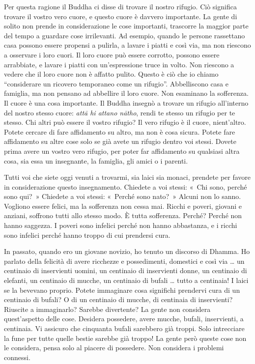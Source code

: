 Per questa ragione il Buddha ci disse di trovare il nostro rifugio. Ciò
significa trovare il vostro vero cuore, e questo cuore è davvero
importante. La gente di solito non prende in considerazione le cose
importanti, trascorre la maggior parte del tempo a guardare cose
irrilevanti. Ad esempio, quando le persone rassettano casa possono
essere propensi a pulirla, a lavare i piatti e così via, ma non riescono
a osservare i loro cuori. Il loro cuore può essere corrotto, possono
essere arrabbiate, e lavare i piatti con un'espressione truce in volto.
Non riescono a vedere che il loro cuore non è affatto pulito. Questo è
ciò che io chiamo ``considerare un ricovero temporaneo come un
rifugio''. Abbelliscono casa e famiglia, ma non pensano ad abbellire il
loro cuore. Non esaminano la sofferenza. Il cuore è una cosa importante.
Il Buddha insegnò a trovare un rifugio all'interno del nostro stesso
cuore: \emph{attā hi attano nātho}, rendi te stesso un rifugio per te
stesso. Chi altri può essere il vostro rifugio? Il vero rifugio è il
cuore, nient'altro. Potete cercare di fare affidamento su altro, ma non
è cosa sicura. Potete fare affidamento su altre cose solo se già avete
un rifugio dentro voi stessi. Dovete prima avere un vostro vero rifugio,
per poter far affidamento su qualsiasi altra cosa, sia essa un
insegnante, la famiglia, gli amici o i parenti.

Tutti voi che siete oggi venuti a trovarmi, sia laici sia monaci,
prendete per favore in considerazione questo insegnamento. Chiedete a
voi stessi: «~Chi sono, perché sono qui?~» Chiedete a voi stessi:
«~Perché sono nato?~» Alcuni non lo sanno. Vogliono essere felici, ma la
sofferenza non cessa mai. Ricchi e poveri, giovani e anziani, soffrono
tutti allo stesso modo. È tutta sofferenza. Perché? Perché non hanno
saggezza. I poveri sono infelici perché non hanno abbastanza, e i ricchi
sono infelici perché hanno troppo di cui prendersi cura.

In passato, quando ero un giovane novizio, ho tenuto un discorso di
Dhamma. Ho parlato della felicità di avere ricchezze e possedimenti,
domestici e così via \ldots{} un centinaio di inservienti uomini, un
centinaio di inservienti donne, un centinaio di elefanti, un centinaio
di mucche, un centinaio di bufali \ldots{} tutto a centinaia! I laici se la
bevevano proprio. Potete immaginare cosa significhi prendervi cura di un
centinaio di bufali? O di un centinaio di mucche, di centinaia di
inservienti? Riuscite a immaginarlo? Sarebbe divertente? La gente non
considera quest'aspetto delle cose. Desidera possedere, avere mucche,
bufali, inservienti, a centinaia. Vi assicuro che cinquanta bufali
sarebbero già troppi. Solo intrecciare la fune per tutte quelle bestie
sarebbe già troppo! La gente però queste cose non le considera, pensa
solo al piacere di possedere. Non considera i problemi connessi.

